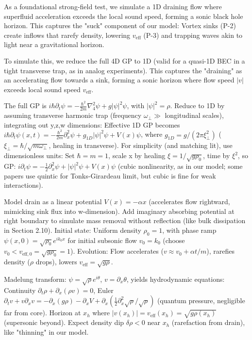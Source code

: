 \documentclass{article}
\begin{document}
As a foundational strong-field test, we simulate a 1D draining flow where superfluid acceleration exceeds the local sound speed, forming a sonic black hole horizon. This captures the "suck" component of our model: Vortex sinks (P-2) create inflows that rarefy density, lowering $v_{\text{eff}}$ (P-3) and trapping waves akin to light near a gravitational horizon.

To simulate this, we reduce the full 4D GP to 1D (valid for a quasi-1D BEC in a tight transverse trap, as in analog experiments). This captures the "draining" as an accelerating flow towards a sink, forming a sonic horizon where flow speed $|v|$ exceeds local sound speed $v_{\text{eff}}$.

The full GP is $i \hbar \partial_t \psi = -\frac{\hbar^2}{2m} \nabla_4^2 \psi + g |\psi|^2 \psi$, with $|\psi|^2 = \rho$. Reduce to 1D by assuming transverse harmonic trap (frequency $\omega_\perp \gg$ longitudinal scales), integrating out y,z,w dimensions: Effective 1D GP becomes $i \hbar \partial_t \psi(x,t) = -\frac{\hbar^2}{2m} \partial_x^2 \psi + g_{1D} |\psi|^2 \psi + V(x) \psi$, where $g_{1D} = g / (2\pi \xi_\perp^2)$ ($\xi_\perp = \hbar / \sqrt{m \omega_\perp}$, healing in transverse). For simplicity (and matching lit), use dimensionless units: Set $\hbar = m = 1$, scale x by healing $\xi = 1 / \sqrt{g \rho_0}$, time by $\xi^2$, so GP: $i \partial_t \psi = -\frac{1}{2} \partial_x^2 \psi + |\psi|^2 \psi + V(x) \psi$ (cubic nonlinearity, as in our model; some papers use quintic for Tonks-Girardeau limit, but cubic is fine for weak interactions).

Model drain as a linear potential $V(x) = -\alpha x$ (accelerates flow rightward, mimicking sink flux into w-dimension). Add imaginary absorbing potential at right boundary to simulate mass removal without reflection (like bulk dissipation in Section 2.10). Initial state: Uniform density $\rho_0 = 1$, with phase ramp $\psi(x,0) = \sqrt{\rho_0} e^{i k_0 x}$ for initial subsonic flow $v_0 = k_0$ (choose $v_0 < v_{\text{eff},0} = \sqrt{g \rho_0} = 1$). Evolution: Flow accelerates ($v \approx v_0 + \alpha t / m$), rarefies density ($\rho$ drops), lowers $v_{\text{eff}} = \sqrt{g \rho}$.

Madelung transform: $\psi = \sqrt{\rho} e^{i \theta}$, $v = \partial_x \theta$, yields hydrodynamic equations: Continuity $\partial_t \rho + \partial_x (\rho v) = 0$, Euler $\partial_t v + v \partial_x v = -\partial_x (g \rho) - \partial_x V + \partial_x (\frac{1}{2} \partial_x^2 \sqrt{\rho} / \sqrt{\rho})$ (quantum pressure, negligible far from core). Horizon at $x_h$ where $|v(x_h)| = v_{\text{eff}}(x_h) = \sqrt{g \rho(x_h)}$ (supersonic beyond). Expect density dip $\delta \rho < 0$ near $x_h$ (rarefaction from drain), like "thinning" in our model.
\end{document}

